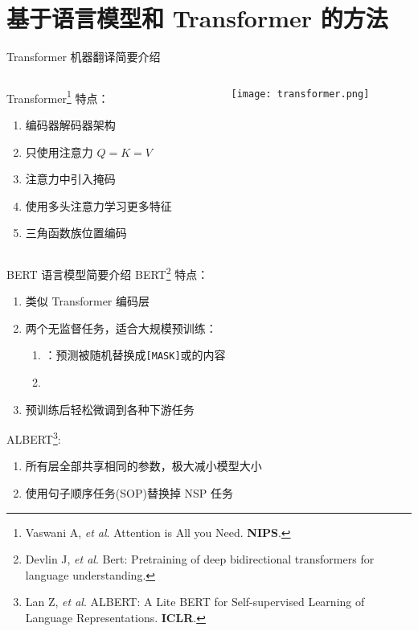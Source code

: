 \section{基于语言模型和 Transformer 的方法}

\begin{frame}[c]{Transformer 机器翻译}{简要介绍}
	\begin{columns}[t]
		\begin{column}[T]{5cm}
			Transformer\footnote{Vaswani A, \textit{et al}. Attention is All you Need. \textbf{NIPS}.} 特点：
			\begin{enumerate}
				\item 编码器解码器架构
				\item 只使用注意力 $Q = K = V$
				\item 注意力中引入掩码
				\item 使用多头注意力学习更多特征
				\item 三角函数族位置编码
			\end{enumerate}
		\end{column}
		\begin{column}[T]{5cm}
			\vspace{-2.5em}
			\texttt{[image: transformer.png]}
		\end{column}
	\end{columns}
\end{frame}

\begin{frame}[c]{BERT 语言模型}{简要介绍}
	BERT\footnote{{\fontsize{7}{7} \selectfont Devlin J, \textit{et al}. Bert: Pre­training of deep bidirectional transformers for language understanding.}} 特点：
	\begin{enumerate}
		\item 类似 Transformer 编码层
		\item 两个无监督任务，适合大规模预训练：
		\begin{enumerate}
			\item {}：预测被随机替换成\texttt{[MASK]}或的内容
			\item {}
		\end{enumerate}
		\item 预训练后轻松微调到各种下游任务
	\end{enumerate}

	ALBERT\footnote{{\fontsize{7}{7} \selectfont Lan Z, \textit{et al}. ALBERT: A Lite BERT for Self-­supervised Learning of Language Representations. \textbf{ICLR}.}}:
	\begin{enumerate}
		\item 所有层全部共享相同的参数，极大减小模型大小
		\item 使用句子顺序任务(SOP)替换掉 NSP 任务
	\end{enumerate}
\end{frame}

